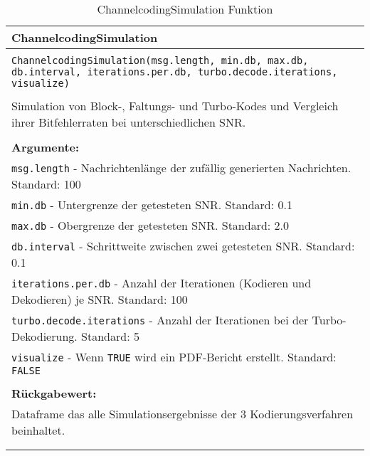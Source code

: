 \begin{longtable}{|p{\textwidth}|}
\hline
\rowcolor{lightblue}
ChannelcodingSimulation
\\
\hline
\\
\texttt{ChannelcodingSimulation(msg.length, min.db, max.db, db.interval, iterations.per.db, turbo.decode.iterations, visualize)}\\
\\
Simulation von Block-, Faltungs- und Turbo-Kodes und Vergleich ihrer Bitfehlerraten bei unterschiedlichen SNR.\\
\\
\textbf{Argumente:}\\
\texttt{msg.length} - Nachrichtenlänge der zufällig generierten Nachrichten. Standard: 100\\
\texttt{min.db} - Untergrenze der getesteten SNR. Standard: 0.1\\
\texttt{max.db} - Obergrenze der getesteten SNR. Standard: 2.0\\
\texttt{db.interval} - Schrittweite zwischen zwei getesteten SNR. Standard: 0.1\\
\texttt{iterations.per.db} - Anzahl der Iterationen (Kodieren und Dekodieren) je SNR. Standard: 100\\
\texttt{turbo.decode.iterations} - Anzahl der Iterationen bei der Turbo-Dekodierung. Standard: 5\\
\texttt{visualize} - Wenn \texttt{TRUE} wird ein PDF-Bericht erstellt. Standard: \texttt{FALSE}\\
\\
\textbf{Rückgabewert:}\\
Dataframe das alle Simulationsergebnisse der 3 Kodierungsverfahren beinhaltet.\\
\\
\hline
\caption{ChannelcodingSimulation Funktion}
\end{longtable}